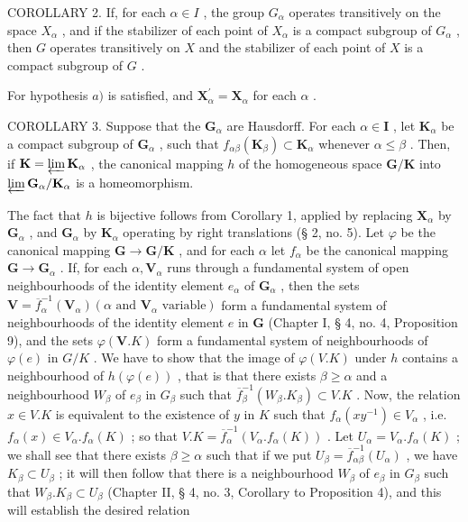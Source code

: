 COROLLARY 2. If, for each \(\alpha \in I\) , the group \(G_{\alpha}\) operates transitively on the space \(X_{\alpha}\) , and if the stabilizer of each point of \(X_{\alpha}\) is a compact subgroup of \(G_{\alpha}\) , then \(G\) operates transitively on \(X\) and the stabilizer of each point of \(X\) is a compact subgroup of \(G\) .

For hypothesis \(a)\) is satisfied, and \(\mathbf{X}_{\alpha}^{\prime} = \mathbf{X}_{\alpha}\) for each \(\alpha\) .

COROLLARY 3. Suppose that the \(\mathbf{G}_{\alpha}\) are Hausdorff. For each \(\alpha \in \mathbf{I}\) , let \(\mathbf{K}_{\alpha}\) be a compact subgroup of \(\mathbf{G}_{\alpha}\) , such that \(f_{\alpha \beta}(\mathbf{K}_{\beta}) \subset \mathbf{K}_{\alpha}\) whenever \(\alpha \leqslant \beta\) . Then, if \(\mathbf{K} = \varprojlim \mathbf{K}_{\alpha}\) , the canonical mapping \(h\) of the homogeneous space \(\mathbf{G} / \mathbf{K}\) into \(\varprojlim \mathbf{G}_{\alpha} / \mathbf{K}_{\alpha}\) is a homeomorphism.

The fact that \(h\) is bijective follows from Corollary 1, applied by replacing \(\mathbf{X}_{\alpha}\) by \(\mathbf{G}_{\alpha}\) , and \(\mathbf{G}_{\alpha}\) by \(\mathbf{K}_{\alpha}\) operating by right translations (§ 2, no. 5). Let \(\varphi\) be the canonical mapping \(\mathbf{G} \to \mathbf{G} / \mathbf{K}\) , and for each \(\alpha\) let \(f_{\alpha}\) be the canonical mapping \(\mathbf{G} \to \mathbf{G}_{\alpha}\) . If, for each \(\alpha, \mathbf{V}_{\alpha}\) runs through a fundamental system of open neighbourhoods of the identity element \(e_{\alpha}\) of \(\mathbf{G}_{\alpha}\) , then the sets \(\mathbf{V} = \overline{f}_{\alpha}^{-1}(\mathbf{V}_{\alpha}) (\alpha \text{ and } \mathbf{V}_{\alpha} \text{ variable})\) form a fundamental system of neighbourhoods of the identity element \(e\) in \(\mathbf{G}\) (Chapter I, § 4, no. 4, Proposition 9), and the sets \(\varphi(\mathbf{V}.K)\) form a fundamental system of neighbourhoods of \(\varphi(e)\) in \(G/K\) . We have to show that the image of \(\varphi(V.K)\) under \(h\) contains a neighbourhood of \(h(\varphi(e))\) , that is that there exists \(\beta \geqslant \alpha\) and a neighbourhood \(W_{\beta}\) of \(e_{\beta}\) in \(G_{\beta}\) such that \(\overline{f}_{\beta}^{-1}(W_{\beta}.K_{\beta}) \subset V.K\) . Now, the relation \(x \in V.K\) is equivalent to the existence of \(y\) in \(K\) such that \(f_{\alpha}(xy^{-1}) \in V_{\alpha}\) , i.e.~\(f_{\alpha}(x) \in V_{\alpha}.f_{\alpha}(K)\) ; so that \(V.K = \overline{f}_{\alpha}^{-1}(V_{\alpha}.f_{\alpha}(K))\) . Let \(U_{\alpha} = V_{\alpha}.f_{\alpha}(K)\) ; we shall see that there exists \(\beta \geqslant \alpha\) such that if we put \(U_{\beta} = \overline{f}_{\alpha\beta}^{-1}(U_{\alpha})\) , we have \(K_{\beta} \subset U_{\beta}\) ; it will then follow that there is a neighbourhood \(W_{\beta}\) of \(e_{\beta}\) in \(G_{\beta}\) such that \(W_{\beta}.K_{\beta} \subset U_{\beta}\) (Chapter II, § 4, no. 3, Corollary to Proposition 4), and this will establish the desired relation

